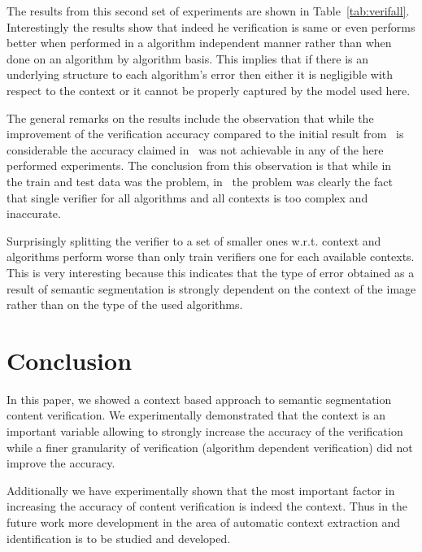 \documentclass[conference]{IEEEtran}
\begin{document}
The results from this second set of experiments are shown in Table~\ref{tab:verifall}. Interestingly the results show that indeed he verification is same or even performs better when performed in a algorithm independent manner rather than when done on an algorithm by algorithm basis. This implies that if there is an underlying structure to each algorithm's error then either it is negligible with respect to the context or it cannot be properly captured by the model used here.

The general remarks on the results include the observation that while the improvement of the verification accuracy compared to the initial result from~\cite{lukac:16} is considerable the accuracy claimed in~\cite{lukac:15} was not achievable in any of the here performed experiments. The conclusion from this observation is that while in~\cite{lukac:15} the train and test data was the problem, in~\cite{lukac:16} the problem was clearly the fact that single verifier for all algorithms and all contexts is too complex and inaccurate. 

Surprisingly splitting the verifier to a set of smaller ones w.r.t. context and algorithms perform worse than only train verifiers one for each available contexts. This is very interesting because this indicates that the type of error obtained as a result of semantic segmentation is strongly dependent on the context of the image rather than on the type of the used algorithms. 

\section{Conclusion}
\label{sec:con}
In this paper, we showed a context based approach to semantic segmentation content verification. We experimentally demonstrated that the context is an important variable allowing to strongly increase the accuracy of the verification while a finer granularity of verification (algorithm dependent verification) did not improve the accuracy. 

Additionally we have experimentally shown that the most important factor in increasing the accuracy of content verification is indeed the context. Thus in the future work more development in the area of automatic context extraction and identification is to be studied and developed.






\end{document}
